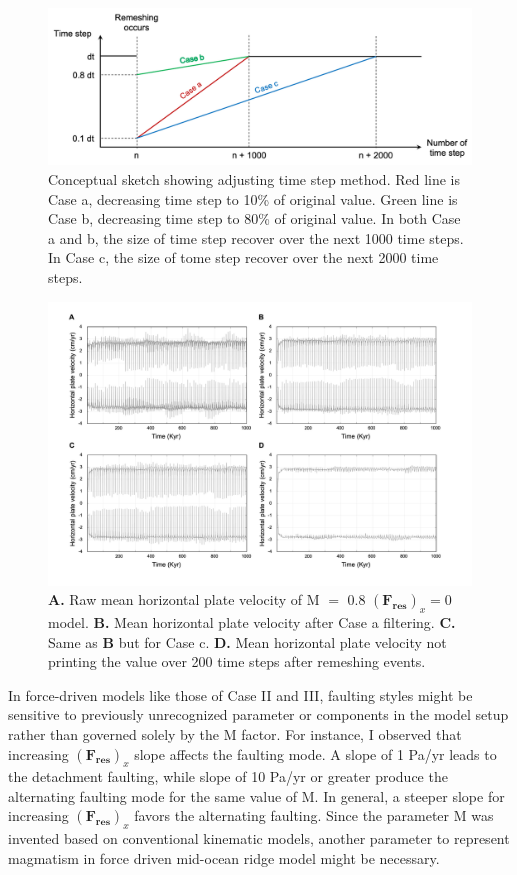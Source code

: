 \documentclass[letterpaper,12pt,notitle]{memphisthesis}                     %
\begin{document}
\begin{figure}[!htb]
	\centering
	\includegraphics[width=0.8\linewidth]{./figs/dtadjust.png}
	\caption{Conceptual sketch showing adjusting time step method. Red line is Case a, decreasing time step to 10\% of original value. Green line is Case b, decreasing time step to 80\% of original value. In both Case a and b, the size of time step recover over the next 1000 time steps. In Case c, the size of tome step recover over the next 2000 time steps.}
	\label{fig:dtadj}
\end{figure}
%
\begin{figure}[!htb]
	\centering
	\includegraphics[width=0.98\linewidth,trim=4 4 4 4,clip]{./figs/remeshing.png}
	\caption{\textbf{A.} Raw mean horizontal plate velocity of M $=$ 0.8 $(\boldsymbol{F_{res}})_x = 0$ model. \textbf{B.} Mean horizontal plate velocity after Case a filtering. \textbf{C.} Same as \textbf{B} but for Case c. \textbf{D.} Mean horizontal plate velocity not printing the value over 200 time steps after remeshing events.}
	\label{fig:remeshing}
\end{figure}

In force-driven models like those of Case II and III, faulting styles might be sensitive to previously unrecognized parameter or components in the model setup rather than governed solely by the M factor. For instance, I observed that increasing $(\boldsymbol{F_{res}})_x$ slope affects the faulting mode. A slope of 1 Pa/yr leads to the detachment faulting, while slope of 10 Pa/yr or greater produce the alternating faulting mode for the same value of M. In general, a steeper slope for increasing $(\boldsymbol{F_{res}})_x$ favors the alternating faulting. Since the parameter M was invented based on conventional kinematic models, another parameter to represent magmatism in force driven mid-ocean ridge model might be necessary.
\end{document}
